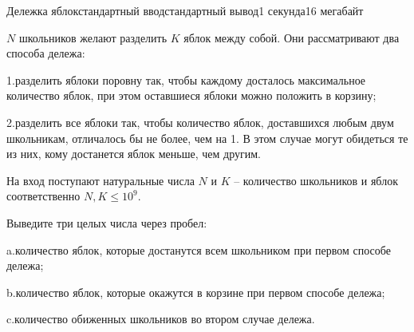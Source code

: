 \begin{problem}{Дележка яблок}{стандартный ввод}{стандартный вывод}{1 секунда}{16 мегабайт}

$N$ школьников желают разделить $K$ яблок между собой. Они рассматривают два способа дележа:

1.разделить яблоки поровну так, чтобы каждому досталось максимальное количество яблок, при этом оставшиеся яблоки можно положить в корзину;

2.разделить все яблоки так, чтобы количество яблок, доставшихся любым двум школьникам, отличалось бы не более, чем на 1. В этом случае могут обидеться те из них, кому достанется яблок меньше, чем другим.

\InputFile
На вход поступают натуральные числа $N$ и $K$ -- количество школьников и яблок соответственно $N, K \leq 10^9$.

\OutputFile
Выведите три целых числа через пробел:

a.количество яблок, которые достанутся всем школьником при первом способе дележа;

b.количество яблок, которые окажутся в корзине при первом способе дележа;

c.количество обиженных школьников во втором случае дележа.

\Examples

\begin{example}
%
%
\end{example}

\end{problem}

